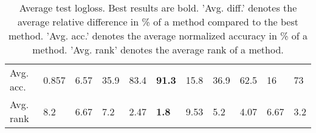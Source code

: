 \begin{table}[ht!]
\begin{tabular}{lllllllllll}
  Avg. acc. & 0.857 & 6.57 & 35.9 & 83.4 & \textbf{91.3} & 15.8 & 36.9 & 62.5 & 16 & 73 \\ 
  Avg. rank & 8.2 & 6.67 & 7.2 & 2.47 & \textbf{1.8} & 9.53 & 5.2 & 4.07 & 6.67 & 3.2 \\ 
   \hline
\hline
\end{tabular}
\endgroup
\caption{Average test logloss. 
                  Best results are bold. 
                  'Avg. diff.' denotes the average relative difference in \% of a method compared to the best method.
                  'Avg. acc.' denotes the average normalized accuracy in \% of a method.
                  'Avg. rank' denotes the average rank of a method.} 
\label{TABLES/table_results_logloss_umap}
\end{table}
